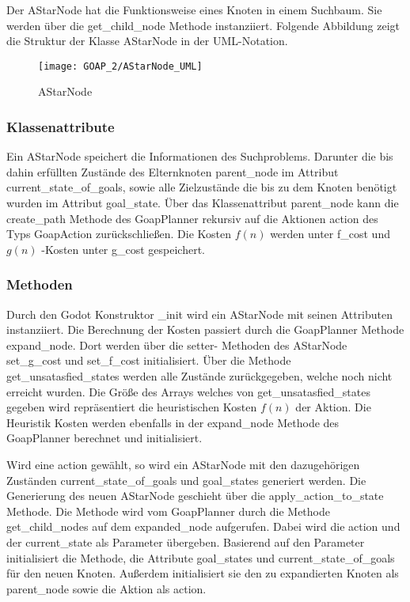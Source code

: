 Der AStarNode hat die Funktionsweise eines Knoten in einem Suchbaum. Sie werden über die get\_child\_node Methode instanziiert. Folgende Abbildung zeigt die Struktur der Klasse AStarNode in der UML-Notation.

\begin{figure}[h]
  \centering
  \texttt{[image: GOAP\_2/AStarNode\_UML]}
	\captionsetup{justification=justified, format=plain}
  \caption{AStarNode}
  \label{AStarNode}
\end{figure}


\subsubsection{Klassenattribute}

Ein AStarNode speichert die Informationen des Suchproblems. Darunter die bis dahin erfüllten Zustände des Elternknoten parent\_node im Attribut current\_state\_of\_goals, sowie alle Zielzustände die bis zu dem Knoten benötigt wurden im Attribut goal\_state. Über das Klassenattribut parent\_node kann die create\_path Methode des GoapPlanner rekursiv auf die Aktionen action des Typs GoapAction zurückschließen. Die Kosten $f(n)$ werden unter f\_cost und $g(n)$ -Kosten unter g\_cost gespeichert.


\subsubsection{Methoden}

Durch den Godot Konstruktor \_init wird ein AStarNode mit seinen Attributen instanziiert. Die Berechnung der Kosten passiert durch die GoapPlanner Methode expand\_node. Dort werden über die setter- Methoden des AStarNode set\_g\_cost und set\_f\_cost initialisiert. Über die Methode get\_unsatasfied\_states werden alle Zustände zurückgegeben, welche noch nicht erreicht wurden. Die Größe des Arrays welches von get\_unsatasfied\_states gegeben wird repräsentiert die heuristischen Kosten $f(n)$ der Aktion. Die Heuristik Kosten werden ebenfalls in der expand\_node Methode des GoapPlanner berechnet und initialisiert.

Wird eine action gewählt, so wird ein AStarNode mit den dazugehörigen Zuständen current\_state\_of\_goals und goal\_states generiert werden. Die Generierung des neuen AStarNode geschieht über die apply\_action\_to\_state Methode. Die Methode wird vom GoapPlanner durch die Methode get\_child\_nodes auf dem expanded\_node aufgerufen. Dabei wird die action und der current\_state als Parameter übergeben. Basierend auf den Parameter initialisiert die Methode, die Attribute goal\_states und current\_state\_of\_goals für den neuen Knoten. Außerdem initialisiert sie den zu expandierten Knoten als parent\_node sowie die Aktion als action.

